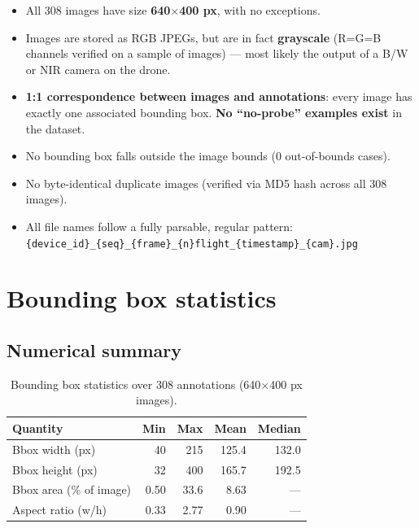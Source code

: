 \documentclass[11pt,a4paper]{article}
\begin{document}
\begin{itemize}[nosep]
    \item All 308 images have size \textbf{640$\times$400 px}, with no exceptions.
    \item Images are stored as RGB JPEGs, but are in fact \textbf{grayscale} (R=G=B channels
          verified on a sample of images) --- most likely the output of a B/W or NIR camera on
          the drone.
    \item \textbf{1:1 correspondence between images and annotations}: every image has exactly
          one associated bounding box. \textbf{No ``no-probe'' examples exist} in the dataset.
    \item No bounding box falls outside the image bounds (0 out-of-bounds cases).
    \item No byte-identical duplicate images (verified via MD5 hash across all 308 images).
    \item All file names follow a fully parsable, regular pattern:\\
          \texttt{\{device\_id\}\_\{seq\}\_\{frame\}\_\{n\}flight\_\{timestamp\}\_\{cam\}.jpg}
\end{itemize}

\section{Bounding box statistics}

\subsection{Numerical summary}

\begin{table}[H]
\centering
\begin{tabular}{lrrrr}
\toprule
\textbf{Quantity} & \textbf{Min} & \textbf{Max} & \textbf{Mean} & \textbf{Median} \\
\midrule
Bbox width (px)               & 40   & 215 & 125.4 & 132.0 \\
Bbox height (px)               & 32   & 400 & 165.7 & 192.5 \\
Bbox area (\% of image)       & 0.50 & 33.6 & 8.63 & --- \\
Aspect ratio (w/h)             & 0.33 & 2.77 & 0.90 & --- \\
\bottomrule
\end{tabular}
\caption{Bounding box statistics over 308 annotations (640$\times$400 px images).}
\label{tab:bboxstats}
\end{table}
\end{document}
